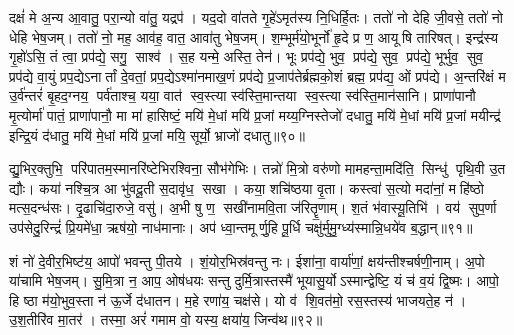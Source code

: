 दक्षं॑ मे अ॒न्य आ॒वातु॒ परा॒न्यो वा॑तु॒ यद्रप॑। यद॒दो वा॑तते गृ॒हे॑ऽमृत॑स्य नि॒धिर्\mbox{}हि॒तः। ततो॑ नो देहि जी॒वसे॒ ततो॑ नो धेहि भेष॒जम्। ततो॑ नो॒ मह॒ आव॑ह॒ वात॒ आवा॑तु भेष॒जम्। श॒म्भूर्म॑यो॒भूर्नो॑ हृ॒दे प्र ण॒ आयूषि तारिषत्। इन्द्र॑स्य गृ॒हो॑ऽसि॒ तं त्वा॒ प्रप॑द्ये॒ सगु॒ साश्व॑। स॒ह यन्मे॒ अस्ति॒ तेन॑। भूः प्रप॑द्ये॒ भुव॒ प्रप॑द्ये॒ सुव॒ प्रप॑द्ये॒ भूर्भुव॒ सुव॒ प्रप॑द्ये वा॒युं प्रप॒द्येऽनार्तां दे॒वतां॒ प्रप॒द्येऽश्मा॑नमाख॒णं प्रप॑द्ये प्र॒जाप॑तेर्ब्रह्मको॒शं ब्रह्म॒ प्रप॑द्य॒ ओं प्रप॑द्ये। अ॒न्तरि॑क्षं म उ॒र्व॑न्तरं॑ बृ॒हद॒ग्नय॒ पर्व॑ताश्च॒ यया॒ वात॑ स्व॒स्त्या स्व॑स्ति॒मान्तया स्व॒स्त्या स्व॑स्ति॒मान॑सानि। प्राणा॑पानौ मृ॒त्योर्मा॑ पातं॒ प्राणा॑पानौ॒ मा मा॑ हासिष्टं॒ मयि॑ मे॒धां मयि॑ प्र॒जां मय्य॒ग्निस्तेजो॑ दधातु॒ मयि॑ मे॒धां मयि॑ प्र॒जां मयीन्द्र॑ इन्द्रि॒यं द॑धातु॒ मयि॑ मे॒धां मयि॑ प्र॒जां मयि॒ सूर्यो॒ भ्राजो॑ दधातु॥९०॥

द्यु॒भिर॒क्तुभि॒ परि॑पातम॒स्मानरि॑ष्टेभिरश्विना॒ सौभ॑गेभिः। तन्नो॑ मि॒त्रो वरु॑णो मामहन्ता॒मदि॑ति॒ सिन्धु॑ पृथि॒वी उ॒त द्यौः। कया॑ नश्चि॒त्र आ भु॑वदू॒ती स॒दावृ॑ध॒ सखा। कया॒ शचि॑ष्ठया वृ॒ता। कस्त्वा॑ स॒त्यो मदा॑नां॒ महि॑ष्ठो मत्स॒दन्ध॑सः। दृ॒ढाचि॑दा॒रुजे॒ वसु॑। अ॒भी षु ण॒ सखी॑नामवि॒ता ज॑रितॄ॒णाम्। श॒तं भ॑वास्यू॒तिभि॑। वय॑ सुप॒र्णा उप॑सेदु॒रिन्द्रं॑ प्रि॒यमे॑धा॒ ऋष॑यो॒ नाध॑मानाः। अप॑ ध्वा॒न्तमूर्णु॒हि पू॒र्धि चक्षु॑र्मुमु॒ग्ध्य॑स्मान्नि॒धये॑व ब॒द्धान्॥९१॥

शं नो॑ दे॒वीर॒भिष्ट॑य॒ आपो॑ भवन्तु पी॒तये। शं॒योर॒भिस्र॑वन्तु नः। ईशा॑ना॒ वार्या॑णां॒ क्षय॑न्तीश्चर्\mbox{}षणी॒नाम्। अ॒पो या॑चामि भेष॒जम्। सु॒मि॒त्रा न॒ आप॒ ओष॑धयः सन्तु दुर्मि॒त्रास्तस्मै॑ भूयासु॒र्योऽस्मान्द्वेष्टि॒ यं च॑ व॒यं द्वि॒ष्मः। आपो॒ हि ष्ठा म॑यो॒भुव॒स्ता न॑ ऊ॒र्जे द॑धातन। म॒हे रणा॑य॒ चक्ष॑से। यो व॑ शि॒वत॑मो॒ रस॒स्तस्य॑ भाजयते॒ह न॑। उ॒श॒तीरि॑व मा॒तर॑। तस्मा॒ अरं॑ गमाम वो॒ यस्य॒ क्षया॑य॒ जिन्व॑थ॥९२॥

